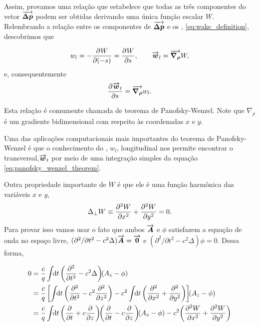 \documentclass[
	12pt,				%
	openright,			%
	oneside,			%
	a4paper,		%
	chapter=TITLE,		%
	section=TITLE,		%
    brazil,				%
	english,			%
	sumario=tradicional,
	]{abntex2}
\begin{document}
Assim, provamos uma relação que estabelece que todas as três componentes do vetor $\vect{\Delta p}$ podem ser obtidas derivando uma única função escalar $W$. Relembrando a relação entre os componentes de $\vect{\Delta p}$ e os , \ref{eq:wake_definition}, descobrimos que

\begin{equation}\label{eq:wake_function_definition}
 w_l = - \derpar{W}{(-s)} = \derpar{W}{s},\qquad \vect{w}_l = \vect{\nabla_\rho}W,
\end{equation}
e, consequentemente
\begin{equation}\label{eq:panofsky_wenzel_theorem}
 \derpar{\vect{w}_t}{s} = \vect{\nabla_\rho}w_l.
\end{equation}

Esta relação é comumente chamada de teorema de Panofsky-Wenzel. Note que $\nabla_\rho$ é um gradiente bidimensional com respeito às coordenadas $x$ e $y$.

Uma das aplicações computacionais mais importantes do teorema de Panofsky-Wenzel é que o conhecimento do , $w_l$, longitudinal nos permite encontrar o  transversal,$\vect{w}_t$ por meio de uma integração simples da equação \ref{eq:panofsky_wenzel_theorem}.

Outra propriedade importante de $W$ é que ele é uma função harmônica das variáveis $x$ e $y$,
\begin{equation}\label{eq:wake_potential_harmonic}
 \Delta_\perp W \equiv \derpar[2]{W}{x} + \derpar[2]{W}{y} = 0.
\end{equation}
Para provar isso vamos usar o fato que ambos $\vect{A}$ e $\phi$ satisfazem a equação de onda no espaço livre, $(\partial^2/\partial t^2 - c^2 \Delta)\vect{A} = \vect{0}$ e $(\partial^2/\partial t^2 - c^2 \Delta)\phi = 0$. Dessa forma,

\begin{equation}\begin{aligned}
0
&=\frac{c}{q}\udefint{t}{\left(\derpar[2]{}{t}-c^2\Delta\right)\!\!(A_z-\phi)}\\
&=\frac{c}{q}\left[\udefint{t}{\left(\derpar[2]{}{t} - c^2\derpar[2]{}{z}\right)} -
	            c^2\udefint{t}{\left(\derpar[2]{}{x} + \derpar[2]{}{y}\right)}\right]\!\!(A_z-\phi)\\
&=\frac{c}{q}\udefint{t}{\left(\derpar{}{t}+c\derpar{}{z}\right)
				     \!\!\left(\derpar{}{t}-c\derpar{}{z}\right)\!\!(A_z -\phi)}
   -c^2\!\left(\derpar[2]{W}{x} + \derpar[2]{W}{y}\right)
\end{aligned}\end{equation}
\end{document}
